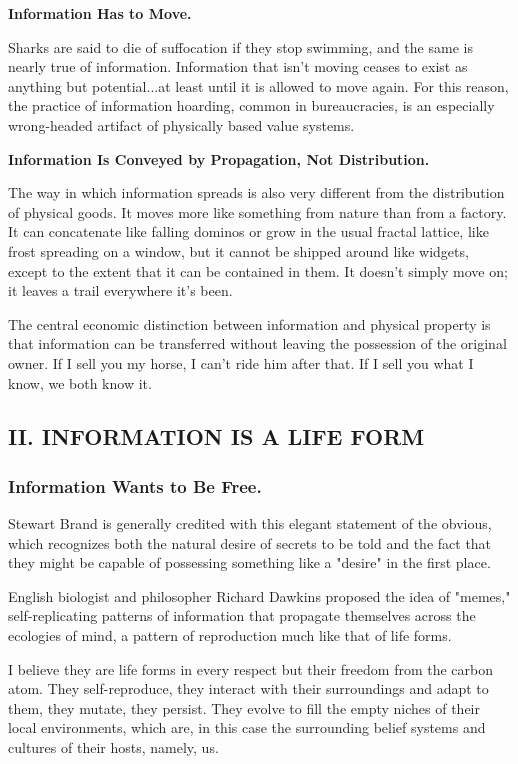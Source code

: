 \documentclass[
]{article}
\begin{document}
\textbf{Information Has to Move.}

Sharks are said to die of suffocation if they stop swimming, and the
same is nearly true of information. Information that isn't moving ceases
to exist as anything but potential...at least until it is allowed to
move again. For this reason, the practice of information hoarding,
common in bureaucracies, is an especially wrong-headed artifact of
physically based value systems.

\textbf{Information Is Conveyed by Propagation, Not Distribution.}

The way in which information spreads is also very different from the
distribution of physical goods. It moves more like something from nature
than from a factory. It can concatenate like falling dominos or grow in
the usual fractal lattice, like frost spreading on a window, but it
cannot be shipped around like widgets, except to the extent that it can
be contained in them. It doesn't simply move on; it leaves a trail
everywhere it's been.

The central economic distinction between information and physical
property is that information can be transferred without leaving the
possession of the original owner. If I sell you my horse, I can't ride
him after that. If I sell you what I know, we both know it.

\hypertarget{header-n266}{%
\subsection{II. INFORMATION IS A LIFE FORM}\label{header-n266}}

\hypertarget{header-n267}{%
\subsubsection{Information Wants to Be Free.}\label{header-n267}}

Stewart Brand is generally credited with this elegant statement of the
obvious, which recognizes both the natural desire of secrets to be told
and the fact that they might be capable of possessing something like a
"desire" in the first place.

English biologist and philosopher Richard Dawkins proposed the idea of
"memes," self-replicating patterns of information that propagate
themselves across the ecologies of mind, a pattern of reproduction much
like that of life forms.

I believe they are life forms in every respect but their freedom from
the carbon atom. They self-reproduce, they interact with their
surroundings and adapt to them, they mutate, they persist. They evolve
to fill the empty niches of their local environments, which are, in this
case the surrounding belief systems and cultures of their hosts, namely,
us.
\end{document}
